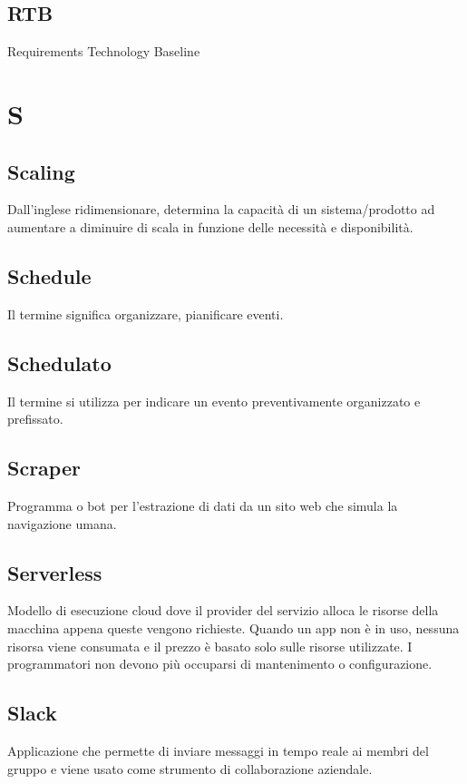 \documentclass{classes/base}
\begin{document}
        \subsection*{RTB}
        Requirements Technology Baseline
        \newpage  
    \section{S}
        \subsection*{Scaling}       
        Dall'inglese ridimensionare, determina la capacità di un sistema/prodotto ad aumentare a diminuire di scala in funzione delle necessità e disponibilità.

        \subsection*{Schedule} 
        Il termine significa organizzare, pianificare eventi.

        \subsection*{Schedulato}
        Il termine si utilizza per indicare un evento preventivamente organizzato e prefissato.
        
        \subsection*{Scraper}
        Programma o bot per l'estrazione di dati da un sito web che simula la navigazione umana.
        
        \subsection*{Serverless}
        Modello di esecuzione cloud dove il provider del servizio alloca le risorse della macchina appena queste vengono richieste. Quando un app non è in uso, nessuna risorsa viene consumata e il prezzo è basato solo sulle risorse utilizzate. I programmatori non devono più occuparsi di mantenimento o configurazione.

        \subsection*{Slack} 
        Applicazione che permette di inviare messaggi in tempo reale ai membri del gruppo e viene usato come strumento di collaborazione aziendale.
\end{document}
